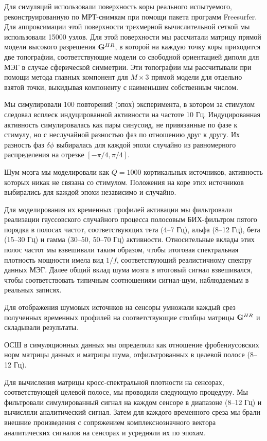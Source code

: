 Для симуляций использовали поверхность коры реального испытуемого,
реконструированную по МРТ-снимкам при помощи пакета программ Freesurfer.
Для аппроксимации этой поверхности трехмерной вычислительной сеткой мы
использовали 15000 узлов. Для этой поверхности мы рассчитали матрицу прямой модели
высокого разрешения $\mathbf{G}^{HR}$, в которой на каждую точку коры приходится
две топографии, соответствующие модели со свободной ориентацией диполя для МЭГ
в случае сферической симметрии. Эти топографии мы рассчитывали при помощи метода главных
компонент для $M \times 3$ прямой модели для отдельно взятой точки, выкидывая
компоненту с наименьшим собственным числом.

Мы симулировали 100 повторений (эпох) эксперимента, в котором за стимулом следовал
всплеск индуцированной активности на частоте 10 Гц. Индуцированная активность
симулировалась как пары синусоид, не привязанные по фазе к стимулу, но с неслучайной
разностью фаз по отношению друг к другу. Их разность фаз $\delta\phi$ выбиралась
для каждой эпохи случайно из равномерного распределения на отрезке $[-\pi/4, \pi/4]$.

Шум мозга мы моделировали как $Q=1000$ кортикальных источников, активность которых
никак не связана со стимулом. Положения на коре этих источников
выбирались для каждой эпохи независимо и случайно.

Для моделирования их временных профилей активации мы фильтровали реализации гауссовского
случайного процесса полосовым БИХ-фильтром пятого порядка в полосах частот,
соответствующих тета (4--7 Гц), альфа (8--12 Гц), бета (15--30 Гц) и гамма (30--50, 50--70 Гц)
активности. Относительные вклады этих полос частот мы взвешивали таким образом, чтобы
итоговая спектральная плотность мощности имела вид $1/f$, соответствующий реалистичному
спектру данных МЭГ. Далее общий вклад шума мозга в итоговый сигнал взвешивался,
чтобы соответствовать типичным соотношениям сигнал-шум, наблюдаемым в реальных
записях.

Для отображения шумовых источнков на сенсоры умножали каждый срез полученных временных
профилей на соответствующие столбцы матрицы $\mathbf{G}^{HR}$ и складывали результаты.

ОСШ в симуляционных данных мы определяли как отношение фробениусовских
норм матрицы данных и матрицы шума, отфильтрованных в целевой полосе (8--12 Гц).

Для вычисления матрицы кросс-спектральной плотности на сенсорах, соответствующей целевой полосе,
мы проводили следующую процедуру.
Мы фильтровали симулированный сигнал на каждом сенсоре в диапазоне (8--12 Гц) и
вычисляли аналитический сигнал.
Затем для каждого временного среза мы брали внешние произведения с сопряжением
комплекснозначного вектора аналитических сигналов на сенсорах и усредняли их по эпохам.

